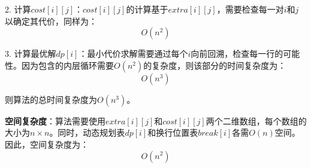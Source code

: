 \documentclass[UTF8]{ctexart}
\begin{document}
2. 计算$cost[i][j]$：$cost[i][j]$的计算基于$extra[i][j]$，需要检查每一对$i$和$j$以确定其代价，同样为：
\[
    O(n^2)
\]

3. 计算最优解$dp[i]$：最小代价求解需要通过每个$i$向前回溯，检查每一行的可能性。因为包含的内层循环需要$O(n^2)$的复杂度，则该部分的时间复杂度为：
   \[
   O(n^3)
   \]

则算法的总时间复杂度为$O(n^3)$。

\textbf{空间复杂度}：算法需要使用$extra[i][j]$和$cost[i][j]$两个二维数组，每个数组的大小为$n \times n$。同时，动态规划表$dp[i]$和换行位置表$break[i]$各需$O(n)$空间。因此，空间复杂度为：
\[
O(n^2)
\]
\end{document}
